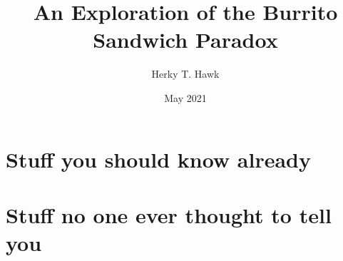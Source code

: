 \documentclass[letterpaper, 11pt]{uithesis}
\title{An Exploration of the Burrito Sandwich Paradox}
\author{Herky T. Hawk}
\date{May 2021}
\begin{document}
\titlepage

\copyrightPage

\frontmatter








\tableofcontents

\listoffigures

\listoftables



\mainmatter




\appendix
\appendixpage
\chapter{Stuff you should know already}
\lipsum[100-120]

\chapter{Stuff no one ever thought to tell you}
\lipsum[121-140]

\backmatter

\printbibliography
\end{document}
